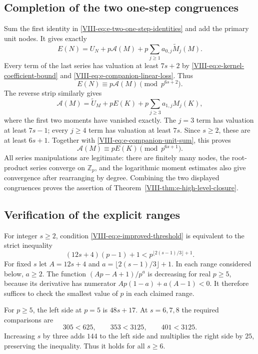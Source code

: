 \documentclass[11pt,letterpaper]{article}
\numberwithin{equation}{section}
\begin{document}
\subsection{Completion of the two one-step congruences}
Sum the first identity in \eqref{VIII-eq:e-two-one-step-identities} and
add the primary unit nodes. It gives exactly
\[
 E(N)=U_N+p\mathcal A(M)
             +p\sum_{j\ge1}a_{0,j}\widetilde M_j(M).
\]
Every term of the last series has valuation at least $7s+2$ by
\eqref{VIII-eq:e-kernel-coefficient-bound} and
\eqref{VIII-eq:e-companion-linear-loss}. Thus
\begin{equation}\label{VIII-eq:e-primary-one-step-congruence}
 E(N)\equiv p\mathcal A(M)\pmod{p^{6s+2}}.
\end{equation}
The reverse strip similarly gives
\[
 \mathcal A(M)=\widetilde U_M+pE(K)
                         +p\sum_{j\ge3}a_{1,j}M_j(K),
\]
where the first two moments have vanished exactly. The $j=3$ term
has valuation at least $7s-1$; every $j\ge4$ term has valuation at
least $7s$. Since $s\ge2$, these are at least $6s+1$.
Together with \eqref{VIII-eq:e-companion-unit-sum}, this proves
\begin{equation}\label{VIII-eq:e-companion-one-step-congruence}
 \mathcal A(M)\equiv pE(K)\pmod{p^{6s+1}}.
\end{equation}
All series manipulations are legitimate: there are finitely many
nodes, the root-product series converge on $\mathbb Z_p$, and the
logarithmic moment estimates also give convergence after rearranging
by degree. Combining the two displayed congruences proves the
assertion of Theorem~\ref{VIII-thm:e-high-level-closure}.

\subsection{Verification of the explicit ranges}
For integer $s\ge2$, condition \eqref{VIII-eq:e-improved-threshold} is
equivalent to the strict inequality
\begin{equation}\label{VIII-eq:e-threshold-power-form}
 (12s+4)(p-1)+1
 <p^{\lfloor2(s-1)/3\rfloor+1}.
\end{equation}
For fixed $s$ let $A=12s+4$ and $a=\lfloor2(s-1)/3\rfloor+1$.
In each range considered below, $a\ge2$. The function
$(Ap-A+1)/p^a$ is decreasing for real $p\ge5$, because its
derivative has numerator $Ap(1-a)+a(A-1)<0$. It therefore suffices
to check the smallest value of $p$ in each claimed range.

For $p\ge5$, the left side at $p=5$ is $48s+17$.
At $s=6,7,8$ the required comparisons are
\[
 305<625,\qquad353<3125,\qquad401<3125.
\]
Increasing $s$ by three adds $144$ to the left side and multiplies
the right side by $25$, preserving the inequality. Thus it holds
for all $s\ge6$.
\end{document}
